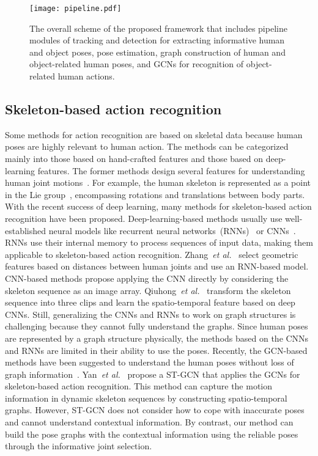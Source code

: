 \documentclass[10pt,twocolumn,letterpaper]{article}
\begin{document}
\begin{figure*}
\begin{center}
\texttt{[image: pipeline.pdf]}
\end{center}
   \caption{The overall scheme of the proposed framework that includes pipeline modules of tracking and detection for extracting informative human and object poses, pose estimation, graph construction of human and object-related human poses, and GCNs for recognition of object-related human actions.} 
\label{fig:pipeline}
\end{figure*}
\subsection{Skeleton-based action recognition}
Some methods for action recognition are based on skeletal data because human poses are highly relevant to human action.
The methods can be categorized mainly into those based on hand-crafted features and those based on deep-learning features.
The former methods design several features for understanding human joint motions~\cite{fernando2015modeling, vemulapalli2014human, wang2016graph}. 
For example, the human skeleton is represented as a point in the Lie group~\cite{vemulapalli2014human}, encompassing rotations and translations between body parts.
With the recent success of deep learning, many methods for skeleton-based action recognition have been proposed.
Deep-learning-based methods usually use well-established neural models like recurrent neural networks~(RNNs)~\cite{liu2016spatio,shahroudy2016ntu,zhang2017geometric} or CNNs~\cite{ke2017new,kim2017interpretable}.
RNNs use their internal memory to process sequences of input data, making them applicable to skeleton-based action recognition.
Zhang~\textit{et al.}~\cite{zhang2017geometric} select geometric features based on distances between human joints and use an RNN-based model.
CNN-based methods propose applying the CNN directly by considering the skeleton sequence as an image array.
Qiuhong~\textit{et al.}~\cite{ke2017new} transform the skeleton sequence into three clips and learn the spatio-temporal feature based on deep CNNs.
Still, generalizing the CNNs and RNNs to work on graph structures is challenging because they cannot fully understand the graphs. 
Since human poses are represented by a graph structure physically, the methods based on the CNNs and RNNs are limited in their ability to use the poses.
Recently, the GCN-based methods have been suggested to understand the human poses without loss of graph information~\cite{tang2018deep,stgcn2018aaai}.
Yan~\textit{et al.}~\cite{stgcn2018aaai} propose a ST-GCN that applies the GCNs for skeleton-based action recognition.
This method can capture the motion information in dynamic skeleton sequences by constructing spatio-temporal graphs.
However, ST-GCN does not consider how to cope with inaccurate poses and cannot understand contextual information.
By contrast, our method can build the pose graphs with the contextual information using the reliable poses through the informative joint selection.
\end{document}
